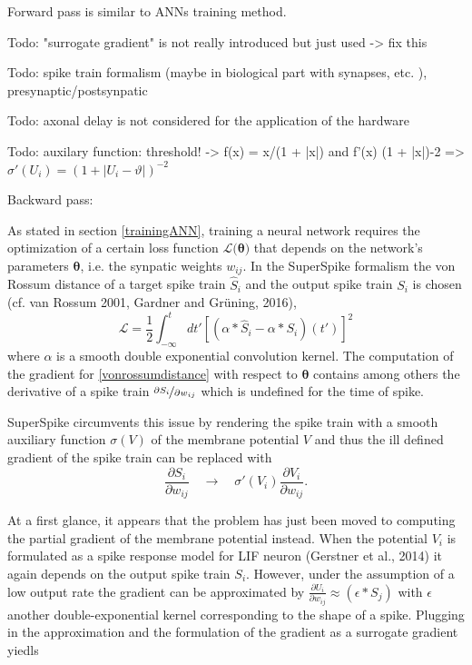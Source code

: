 Forward pass is similar to ANNs training method.

Todo: "surrogate gradient" is not really introduced but just used -> fix this

Todo: spike train formalism (maybe in biological part with synapses, etc. ), presynaptic/postsynpatic 

Todo: axonal delay is not considered for the application of the hardware

Todo: auxilary function: threshold! -> f(x) = x/(1 + |x|) and f'(x) (1 + |x|)-2 => $\sigma'(U_i) = (1+|U_i - \vartheta|)^{-2}$

Backward pass:

As stated in section \ref{trainingANN}, training a neural network requires the optimization of a certain loss function $\mathcal{L(\mathbf{\theta)}}$ that depends on the network's parameters $\mathbf{\theta}$, i.e. the synpatic weights $w_{ij}$. In the SuperSpike formalism the von Rossum distance of a target spike train $\hat{S}_i$ and the output spike train $S_i$ is chosen (cf. van Rossum 2001, Gardner and Grüning, 2016),
\begin{equation}
\label{vonrossumdistance}
\mathcal{L} = \frac{1}{2} \int^t_{-\infty}dt' \left[\left(\alpha \ast \hat{S}_i - \alpha \ast S_i \right)(t')\right]^2
\end{equation}
where $\alpha$ is a smooth double exponential convolution kernel. The computation of the gradient for \ref{vonrossumdistance} with respect to $\mathbf{\theta}$ contains among others the derivative of a spike train $\nicefrac{\partial{S_i}}{\partial{w_{ij}}}$ which is undefined for the time of spike. 

SuperSpike circumvents this issue by rendering the spike train with a smooth auxiliary function $\sigma(V)$ of the membrane potential $V$ and thus the ill defined gradient of the spike train can be replaced with 
\begin{equation}
\frac{\partial S_i}{\partial w_{ij}} \quad \rightarrow \quad \sigma'(V_i)\frac{\partial V_i}{\partial w_{ij}}.
\end{equation}

At a first glance, it appears that the problem has just been moved to computing the partial gradient of the membrane potential instead. When the potential $V_i$ is formulated as a spike response model for LIF neuron (Gerstner et al., 2014) it again depends on the output spike train $S_i$. However, under the assumption of a low output rate the gradient can be approximated by $\frac{\partial U_i}{\partial w_{ij}} \approx (\epsilon \ast S_j)$ with $\epsilon$ another double-exponential kernel corresponding to the shape of a spike. Plugging in the approximation and the formulation of the gradient as a surrogate gradient yiedls


